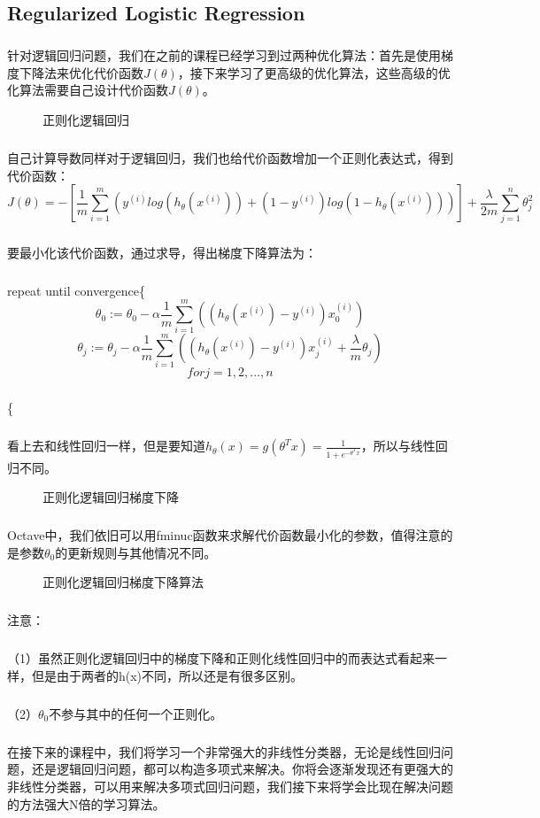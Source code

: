 \documentclass{article}
\begin{document}
\begin{CJK}{UTF8}{gbsn}
\subsection{Regularized Logistic Regression}
\subparagraph{}
针对逻辑回归问题，我们在之前的课程已经学习到过两种优化算法：首先是使用梯度下降法来优化代价函数$J(\theta)$，接下来学习了更高级的优化算法，这些高级的优化算法需要自己设计代价函数$J(\theta)$。
\begin{figure}[H]
\caption{正则化逻辑回归}
\label{fig:370}
\end{figure}
\subparagraph{}
自己计算导数同样对于逻辑回归，我们也给代价函数增加一个正则化表达式，得到代价函数：
\begin{equation}
J(\theta)=-[\frac{1}{m}\sum_{i=1}^m(y^{(i)}log(h_\theta(x^{(i)}))+(1-y^{(i)})log(1-h_\theta(x^{(i)})))]+\frac{\lambda}{2m}\sum_{j=1}^n\theta_j^2
\end{equation}
\subparagraph{}
要最小化该代价函数，通过求导，得出梯度下降算法为：
\subparagraph{}
repeat until convergence\{{}
\begin{equation}
\theta_0:=\theta_0-\alpha\frac{1}{m}\sum_{i=1}^m((h_\theta(x^{(i)})-y^{(i)})x_0^{(i)})
\end{equation}
\begin{equation}
\theta_j:=\theta_j-\alpha\frac{1}{m}\sum_{i=1}^m((h_\theta(x^{(i)})-y^{(i)})x_j^{(i)}+\frac{\lambda}{m}\theta_j)
\end{equation}
\begin{equation}
for j=1,2,...,n
\end{equation}
\subparagraph{}
\{{}
\subparagraph{}
看上去和线性回归一样，但是要知道$h_\theta(x)=g(\theta^Tx)=\frac{1}{1+e^{-\theta^Tx}}$，所以与线性回归不同。
\begin{figure}[H]
\caption{正则化逻辑回归梯度下降}
\label{fig:372}
\end{figure}
\subparagraph{}
Octave中，我们依旧可以用fminuc函数来求解代价函数最小化的参数，值得注意的是参数$\theta_0$的更新规则与其他情况不同。
\begin{figure}[H]
\caption{正则化逻辑回归梯度下降算法}
\label{fig:373}
\end{figure}
\subparagraph{}
注意：
\subparagraph{}
（1）虽然正则化逻辑回归中的梯度下降和正则化线性回归中的而表达式看起来一样，但是由于两者的h(x)不同，所以还是有很多区别。
\subparagraph{}
（2）$\theta_0$不参与其中的任何一个正则化。
\subparagraph{}
在接下来的课程中，我们将学习一个非常强大的非线性分类器，无论是线性回归问题，还是逻辑回归问题，都可以构造多项式来解决。你将会逐渐发现还有更强大的非线性分类器，可以用来解决多项式回归问题，我们接下来将学会比现在解决问题的方法强大N倍的学习算法。
\end{CJK}
\end{document}
